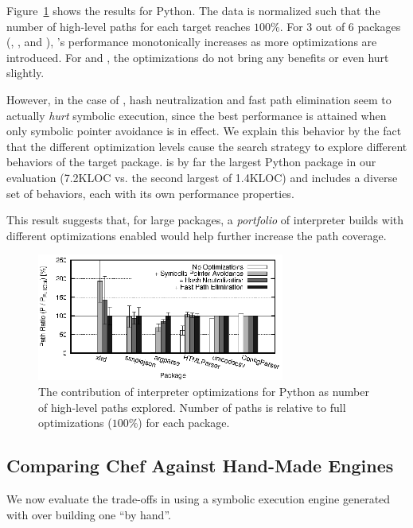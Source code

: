 Figure~\ref{fig:optimizations} shows the results for Python.  The data is normalized such that the number of high-level paths for each target reaches $100\%$.  For 3 out of 6 packages (, , and ), \chef's performance monotonically increases as more optimizations are introduced.  For  and , the optimizations do not bring any benefits or even hurt slightly.  

However, in the case of , hash neutralization and fast path elimination seem to actually \emph{hurt} symbolic execution, since the best performance is attained when only symbolic pointer avoidance is in effect.  We explain this behavior by the fact that the different optimization levels cause the search strategy to explore different behaviors of the target package.   is by far the largest Python package in our evaluation (7.2KLOC vs. the second largest of 1.4KLOC) and includes a diverse set of behaviors, each with its own performance properties.

This result suggests that, for large packages, a \emph{portfolio} of interpreter builds with different optimizations enabled would help further increase the path coverage.

\begin{figure}
  \centering
  \includegraphics[width=3.2in]{figures/evaluation/optimizations-bars-python}
  \caption{The contribution of interpreter optimizations for Python as number of high-level paths explored.  Number of paths is relative to full optimizations ($100\%$) for each package.}
  \label{fig:optimizations}
\end{figure}


\subsection{Comparing Chef Against Hand-Made Engines}
\label{sec:sub:comparison}

We now evaluate the trade-offs in using a symbolic execution engine generated with \chef over building one ``by hand''.

